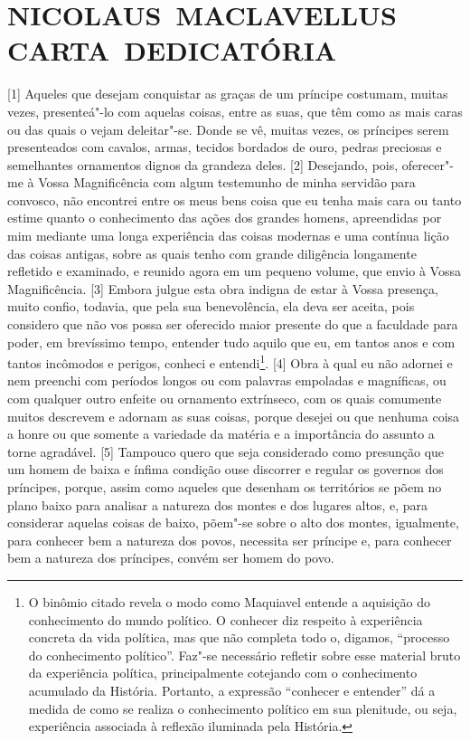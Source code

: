 \section*{NICOLAUS~MACLAVELLUS \break{}CARTA~DEDICATÓRIA}

{[}1{]} Aqueles que desejam conquistar as graças de um príncipe
costumam, muitas vezes, presenteá"-lo com aquelas coisas, entre as suas,
que têm como as mais caras ou das quais o vejam deleitar"-se. Donde se
vê, muitas vezes, os príncipes serem presenteados com cavalos, armas,
tecidos bordados de ouro, pedras preciosas e semelhantes ornamentos
dignos da grandeza deles. {[}2{]} Desejando, pois, oferecer"-me à Vossa
Magnificência com algum testemunho de minha servidão para convosco, não
encontrei entre os meus bens coisa que eu tenha mais cara ou tanto
estime quanto o conhecimento das ações dos grandes homens, apreendidas
por mim mediante uma longa experiência das coisas modernas e uma
contínua lição das coisas antigas, sobre as quais tenho com grande
diligência longamente refletido e examinado, e reunido agora em um
pequeno volume, que envio à Vossa Magnificência. {[}3{]} Embora julgue
esta obra indigna de estar à Vossa presença, muito confio, todavia, que
pela sua benevolência, ela deva ser aceita, pois considero que não vos
possa ser oferecido maior presente do que a faculdade para poder, em
brevíssimo tempo, entender tudo aquilo que eu, em tantos anos e com
tantos incômodos e perigos, conheci e entendi\footnote{O binômio citado
  revela o modo como Maquiavel entende a aquisição do conhecimento do
  mundo político. O conhecer diz respeito à experiência concreta da vida
  política, mas que não completa todo o, digamos, ``processo do
  conhecimento político''. Faz"-se necessário refletir sobre esse
  material bruto da experiência política, principalmente cotejando com o
  conhecimento acumulado da História. Portanto, a expressão ``conhecer e
  entender'' dá a medida de como se realiza o conhecimento político em
  sua plenitude, ou seja, experiência associada à reflexão iluminada
  pela História.}. {[}4{]} Obra à qual eu não adornei e nem preenchi com
períodos longos ou com palavras empoladas e magníficas, ou com qualquer
outro enfeite ou ornamento extrínseco, com os quais comumente muitos
descrevem e adornam as suas coisas, porque desejei ou que nenhuma coisa
a honre ou que somente a variedade da matéria e a importância do assunto
a torne agradável. {[}5{]} Tampouco quero que seja considerado como
presunção que um homem de baixa e ínfima condição ouse discorrer e
regular os governos dos príncipes, porque, assim como aqueles que
desenham os territórios se põem no plano baixo para analisar a natureza
dos montes e dos lugares altos, e, para considerar aquelas coisas de
baixo, põem"-se sobre o alto dos montes, igualmente, para conhecer bem a
natureza dos povos, necessita ser príncipe e, para conhecer bem a
natureza dos príncipes, convém ser homem do povo.

